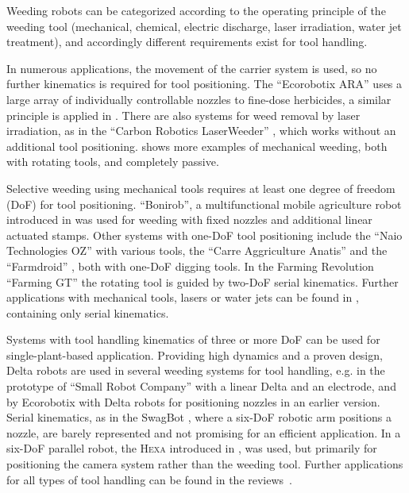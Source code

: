 \documentclass[runningheads,hidelinks]{llncs}
\begin{document}
Weeding robots can be categorized according to the operating principle of the weeding tool (mechanical, chemical, electric discharge, laser irradiation, water jet treatment), and accordingly different requirements exist for tool handling.%

In numerous applications, the movement of the carrier system is used, so no further kinematics is required for tool positioning. 
The ``Ecorobotix ARA'' \cite{Ecorobotix} uses a large array of individually controllable nozzles to fine-dose herbicides, a similar principle is applied in \cite{Utstumo2018}. 
There are also systems for weed removal by laser irradiation, as in the ``Carbon Robotics LaserWeeder'' \cite{CarbonRobotics}, which works without an additional tool positioning. 
\cite{Zhang2022} shows more examples of mechanical weeding, both with rotating tools, and completely passive. 

Selective weeding using mechanical tools requires at least one degree of freedom (DoF) for tool positioning. 
``Bonirob'', a multifunctional mobile agriculture robot introduced in \cite{Ruckelshausen2009} was used for weeding with fixed nozzles and additional linear actuated stamps. 
Other systems with one-DoF tool positioning include the ``Naio Technologies OZ'' \cite{NaioTechnologies} with various tools, the ``Carre Aggriculture Anatis'' \cite{CarbonRobotics} and the ``Farmdroid'' \cite{Farmdroid}, both with one-DoF digging tools. 
In the Farming Revolution ``Farming GT'' \cite{farming_revolution} the rotating tool is guided by two-DoF serial kinematics. 
Further applications with mechanical tools, lasers or water jets can be found in \cite{Zhang2022}, containing only serial kinematics. 


Systems with tool handling kinematics of three or more DoF can be used for single-plant-based application. 
Providing high dynamics and a proven design, Delta robots are used in several weeding systems for tool handling, e.g. in the prototype of ``Small Robot Company'' \cite{SmallRobotCompany24-01-2023} with a linear Delta and an electrode, and by Ecorobotix \cite{Ecorobotix} with Delta robots for positioning nozzles in an earlier version. 
Serial kinematics, as in the SwagBot \cite{Eiffert2021}, where a six-DoF robotic arm positions a nozzle, are barely represented and not promising for an efficient application. 
In \cite{Blasco2002} a six-DoF parallel robot, the \textsc{Hexa} introduced in \cite{Pierrot1991}, was used, but primarily for positioning the camera system rather than the weeding tool. 
Further applications for all types of tool handling can be found in the reviews~\cite{Zhang2022,Fountas2020,Oliveira2021}. 
\end{document}
